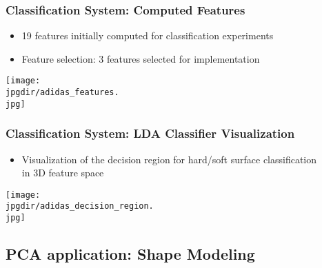 \begin{frame}
	\frametitle{Classification System: Computed Features}

	\begin{itemize}
		\item 19 features initially computed for classification experiments
		\item Feature selection: 3 features selected for implementation
	\end{itemize}

	\begin{center}
		\texttt{[image: \\jpgdir/adidas\_features.\\jpg]}
	\end{center}
\end{frame}


\begin{frame}
	\frametitle{Classification System: LDA Classifier Visualization}

	\begin{itemize}
		\item Visualization of the decision region for hard/soft surface classification \\
		      in 3D feature space
	\end{itemize}

	\begin{center}
		\texttt{[image: \\jpgdir/adidas\_decision\_region.\\jpg]}
	\end{center}
\end{frame}


\iftrue

	\subsection{PCA application: Shape Modeling}

